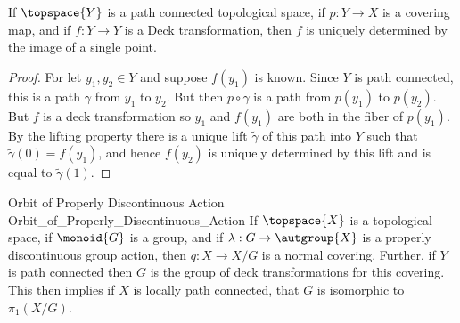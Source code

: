     \begin{theorem}
        If $\topspace{Y}$ is a path connected topological space, if
        $p:Y\rightarrow{X}$ is a covering map, and if $f:Y\rightarrow{Y}$ is a
        Deck transformation, then $f$ is uniquely determined by the image of a
        single point.
    \end{theorem}
    \begin{proof}
        For let $y_{1},y_{2}\in{Y}$ and suppose $f(y_{1})$ is known. Since $Y$
        is path connected, this is a path $\gamma$ from $y_{1}$ to $y_{2}$. But
        then $p\circ\gamma$ is a path from $p(y_{1})$ to $p(y_{2})$. But $f$ is
        a deck transformation so $y_{1}$ and $f(y_{1})$ are both in the fiber of
        $p(y_{1})$. By the lifting property there is a unique lift
        $\tilde{\gamma}$ of this path
        into $Y$ such that $\tilde{\gamma}(0)=f(y_{1})$, and hence
        $f(y_{2})$ is uniquely determined by this lift and is equal to
        $\tilde{\gamma}(1)$.
    \end{proof}
    \begin{ftheorem}{Orbit of Properly Discontinuous Action}
                    {Orbit_of_Properly_Discontinuous_Action}
        If $\topspace{X}$ is a topological space, if $\monoid{G}$ is a group,
        and if $\lambda:G\rightarrow\autgroup{X}$ is a properly discontinuous
        group action, then $q:X\rightarrow{X}/G$ is a normal covering. Further,
        if $Y$ is path connected then $G$ is the group of deck transformations
        for this covering. This then implies if $X$ is locally path connected,
        that $G$ is isomorphic to $\pi_{1}(X/G)$.
    \end{ftheorem}
